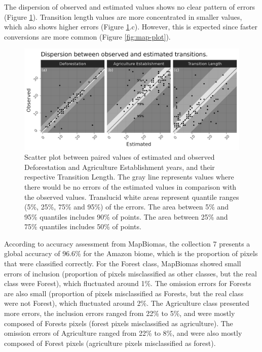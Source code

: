 \documentclass[essd, manuscript]{copernicus}
\begin{document}
The dispersion of observed and estimated values shows no clear pattern of errors (Figure \ref{fig:errorscatter-plot}).
Transition length values are more concentrated in smaller values, which also shows higher errors (Figure \ref{fig:errorscatter-plot}.c).
However, this is expected since faster conversions are more common (Figure \ref{fig:map-plot}).

\begin{figure}[h]
\includegraphics[width=17cm]{figs/error_scatter} \caption{Scatter plot between paired values of estimated and observed Deforestation and Agriculture Establishment years, and their respective Transition Length. The gray line represents values where there would be no errors of the estimated values in comparison with the observed values. Translucid white areas represent quantile ranges (5\%, 25\%, 75\% and 95\%) of the errors. The area between 5\% and 95\% quantiles includes 90\% of points. The area between 25\% and 75\% quantiles includes 50\% of points.}\label{fig:errorscatter-plot}
\end{figure}

According to accuracy assessment from MapBiomas, the collection 7 presents a global accuracy of 96.6\% for the Amazon biome, which is the proportion of pixels that were classified correctly.
For the Forest class, MapBiomas showed small errors of inclusion (proportion of pixels misclassified as other classes, but the real class were Forest), which fluctuated around 1\%.
The omission errors for Forests are also small (proportion of pixels misclassified as Forests, but the real class were not Forest), which fluctuated around 2\%.
The Agriculture class presented more errors, the inclusion errors ranged from 22\% to 5\%, and were mostly composed of Forests pixels (forest pixels misclassified as agriculture).
The omission errors of Agriculture ranged from 22\% to 8\%, and were also mostly composed of Forest pixels (agriculture pixels misclassified as forest).
\end{document}
